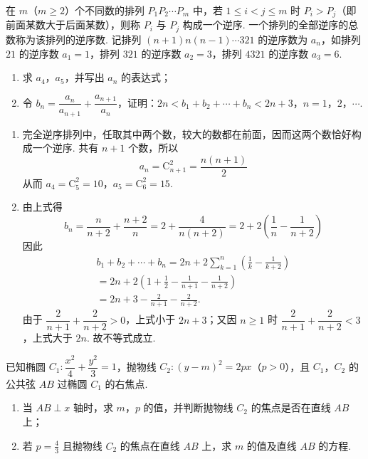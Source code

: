 \begin{problem}
在 \(m\)（\(m\geqslant2\)）个不同数的排列 \(P_1P_2\cdots P_m\) 中，若 \(1\leqslant i<j\leqslant m\) 时 \(P_i>P_j\)（即前面某数大于后面某数），则称 \(P_i\) 与 \(P_j\) 构成一个逆序. 一个排列的全部逆序的总数称为该排列的逆序数. 记排列 \((n+1)n(n-1)\cdots321\) 的逆序数为 \(a_n\)，如排列 \(21\) 的逆序数 \(a_1=1\)，排列 \(321\) 的逆序数 \(a_2=3\)，排列 \(4321\) 的逆序数 \(a_3=6\).

\begin{enumerate}
\item 求 \(a_4\)，\(a_5\)，并写出 \(a_n\) 的表达式；
\item 令 \(b_n=\dfrac{a_n}{a_{n+1}}+\dfrac{a_{n+1}}{a_n}\)，证明：\(2n<b_1+b_2+\cdots+b_n<2n+3\)，\(n=1\)，\(2\)，\(\cdots\).
\end{enumerate}
\end{problem}

\begin{solution}
\begin{enumerate}
\item 完全逆序排列中，任取其中两个数，较大的数都在前面，因而这两个数恰好构成一个逆序. 共有 \(n+1\) 个数，所以
\[
a_n=\mathrm C_{n+1}^2=\frac{n(n+1)}{2}
\]
从而 \(a_4=\mathrm C_5^2=10\)，\(a_5=\mathrm C_6^2=15\).
\item 由上式得
\[
b_n=\frac{n}{n+2}+\frac{n+2}{n}=2+\frac{4}{n(n+2)}=2+2\left(\frac1n-\frac1{n+2}\right)
\]
因此
\[
\begin{gathered}
b_1+b_2+\cdots+b_n
 =2n+2\sum_{k=1}^{n}\left(\frac1k-\frac1{k+2}\right)\\
 =2n+2\left(1+\frac12-\frac1{n+1}-\frac1{n+2}\right)\\
 =2n+3-\frac2{n+1}-\frac2{n+2}.
\end{gathered}
\]
由于 \(\dfrac2{n+1}+\dfrac2{n+2}>0\)，上式小于 \(2n+3\)；又因 \(n\geqslant1\) 时 \(\dfrac2{n+1}+\dfrac2{n+2}<3\)，上式大于 \(2n\). 故不等式成立.
\end{enumerate}
\end{solution}

\begin{problem}
已知椭圆 \(C_1:\dfrac{x^2}{4}+\dfrac{y^2}{3}=1\)，抛物线 \(C_2:(y-m)^2=2px\)（\(p>0\)），且 \(C_1\)，\(C_2\) 的公共弦 \(AB\) 过椭圆 \(C_1\) 的右焦点.

\begin{enumerate}
\item 当 \(AB\perp x\) 轴时，求 \(m\)，\(p\) 的值，并判断抛物线 \(C_2\) 的焦点是否在直线 \(AB\) 上；
\item 若 \(p=\frac43\) 且抛物线 \(C_2\) 的焦点在直线 \(AB\) 上，求 \(m\) 的值及直线 \(AB\) 的方程.
\end{enumerate}
\end{problem}

